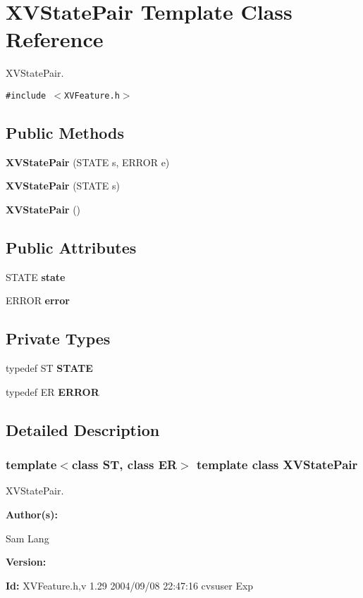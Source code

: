 \hypertarget{class_XVStatePair}{
\section{XVState\-Pair  Template Class Reference}
\label{XVStatePair}
}
XVState\-Pair. 


{\tt \#include $<$XVFeature.h$>$}

\subsection*{Public Methods}
\begin{CompactItemize}
\item 
{\bf XVState\-Pair} (STATE s, ERROR e)
\item 
{\bf XVState\-Pair} (STATE s)
\item 
{\bf XVState\-Pair} ()
\end{CompactItemize}
\subsection*{Public Attributes}
\begin{CompactItemize}
\item 
STATE {\bf state}
\item 
ERROR {\bf error}
\end{CompactItemize}
\subsection*{Private Types}
\begin{CompactItemize}
\item 
typedef ST {\bf STATE}
\item 
typedef ER {\bf ERROR}
\end{CompactItemize}


\subsection{Detailed Description}
\subsubsection*{template$<$class ST, class ER$>$  template class XVState\-Pair}

XVState\-Pair.

\begin{Desc}
\item[{\bf Author(s): }]\par
 Sam Lang \end{Desc}
\begin{Desc}
\item[{\bf Version: }]\par
 \end{Desc}
\begin{Desc}
\item[{\bf Id: }] XVFeature.h,v 1.29 2004/09/08 22:47:16 cvsuser Exp \end{Desc}


